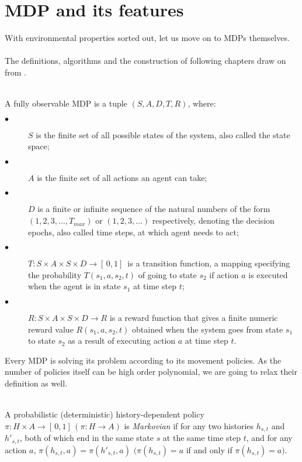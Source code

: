\section{MDP and its features}
With environmental properties sorted out, let us move on to MDPs themselves. 
\\ 
\\
The definitions, algorithms and the construction of following chapters draw on from \cite{Kolobov2012}. 
  \\ \\

\begin{definition}\label{def:MDP}
A fully observable MDP is a tuple $(S, A, D, T, R)$, where:
\begin{description}
  \item[$\bullet$ ] $S$ is the finite set of all possible states of the system, also called the state space;
  \item[$\bullet$ ] $A$ is the finite set of all actions an agent can take;
  \item[$\bullet$ ] $D$ is a finite or infinite sequence of the natural numbers of the form $(1, 2, 3, \ldots, T_{max})$ or $(1, 2, 3, \ldots)$ respectively, 
        denoting the decision epochs, also called time steps, at which agent needs to act;
  \item[$\bullet$ ] $T : S \times A \times S \times D \rightarrow [ \,0, 1] \,$ is a transition function, a mapping specifying the probability $T(s_1, a, s_2, t)$ of going to state $s_2$ if action $a$ is executed when the agent is in state $s_1$ at time step $t$;
  \item[$\bullet$ ] $R : S \times A \times S \times D \rightarrow R$ is a reward function that gives a finite numeric reward value $R(s_1, a, s_2, t)$ obtained when the system goes from state $s_1$ to state $s_2$ as a result of executing action $a$ at time step $t$.
\end{description}

\end{definition}

Every MDP is solving its problem according to its movement policies. As the number of policies itself can be high order polynomial, we are going to relax their definition as well.
\\ \\
\begin{definition}
A probabilistic (deterministic) history-dependent policy $\pi: H \times A \rightarrow [ \,0, 1] \,(\pi: H \rightarrow A)$ is \textit{Markovian} if for any two histories $h_{s,t}$ and $h'_{s,t}$, both of which end in the same state $s$ at the same time step $t$, and for any action $a$, 
$\pi(h_{s,t}, a) = \pi(h'_{s,t}, a)$ $(\pi(h_{s,t}) = a$ if and only if $\pi(h_{s,t}) = a)$.
\end{definition}


